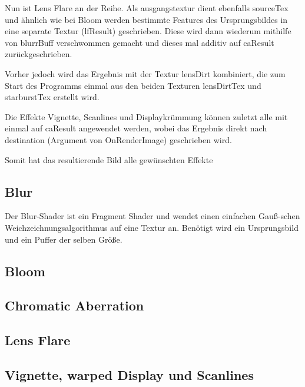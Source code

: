 Nun ist Lens Flare an der Reihe. Als ausgangstextur dient ebenfalls sourceTex und ähnlich wie bei Bloom werden bestimmte Features des Ursprungsbildes in eine separate Textur (lfResult) geschrieben. Diese wird dann wiederum mithilfe von blurrBuff verschwommen gemacht und dieses mal additiv auf caResult zurückgeschrieben. 


Vorher jedoch wird das Ergebnis mit der Textur lensDirt kombiniert, die zum Start des Programms einmal aus den beiden Texturen lensDirtTex und starburstTex erstellt wird.


Die Effekte Vignette, Scanlines und Displaykrümmung können zuletzt alle mit einmal auf caResult angewendet werden, wobei das Ergebnis direkt nach destination (Argument von OnRenderImage) geschrieben wird.


Somit hat das resultierende Bild alle gewünschten Effekte



\subsection{Blur}

Der Blur-Shader ist ein Fragment Shader und wendet einen einfachen Gau{\ss}-schen Weichzeichnungsalgorithmus auf eine Textur an. Benötigt wird ein Ursprungsbild und ein Puffer der selben Grö{\ss}e.



\subsection{Bloom}

\lipsum[3]



\subsection{Chromatic Aberration}

\lipsum[3]



\subsection{Lens Flare}

\lipsum[3]



\subsection{Vignette, warped Display und Scanlines}

\lipsum[3]
